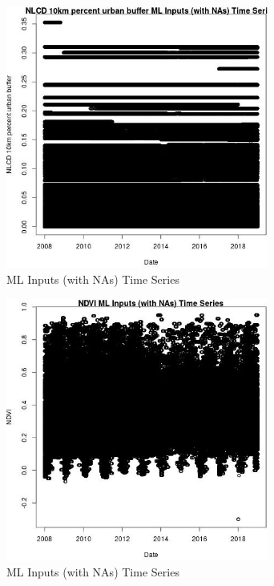 \begin{figure} 
\centering  
\includegraphics[width=0.77\textwidth]{Code_Outputs/Report_ML_input_PM25_Step4_part_f_de_duplicated_aves_prioritize_24hr_obswNAs_NLCD_10km_percent_urban_buffervDate.jpg} 
\caption{\label{fig:Report_ML_input_PM25_Step4_part_f_de_duplicated_aves_prioritize_24hr_obswNAsNLCD_10km_percent_urban_buffervDate}ML Inputs (with NAs) Time Series} 
\end{figure} 
 

\begin{figure} 
\centering  
\includegraphics[width=0.77\textwidth]{Code_Outputs/Report_ML_input_PM25_Step4_part_f_de_duplicated_aves_prioritize_24hr_obswNAs_NDVIvDate.jpg} 
\caption{\label{fig:Report_ML_input_PM25_Step4_part_f_de_duplicated_aves_prioritize_24hr_obswNAsNDVIvDate}ML Inputs (with NAs) Time Series} 
\end{figure} 
 

